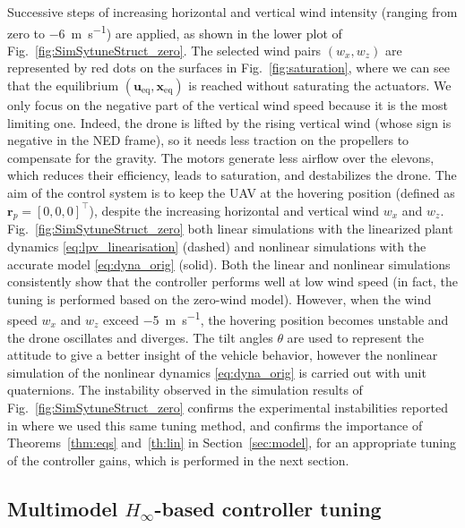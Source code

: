 Successive steps of increasing horizontal and vertical wind intensity (ranging from zero to \SI{-6}{\meter\per\second}) are applied, as shown in the lower plot of Fig.~\ref{fig:SimSytuneStruct_zero}. The selected wind pairs $(w_{x}, w_{z})$ are represented by red dots on the surfaces in Fig.~\ref{fig:saturation}, where we can see that the equilibrium $(\boldsymbol{u}_{\text{eq}}, \boldsymbol{x}_{\text{eq}})$ is reached without saturating the actuators. We only focus on the negative part of the vertical wind speed because it is the most limiting one. Indeed, the drone is lifted by the rising vertical wind (whose sign is negative in the NED frame), so it needs less traction on the propellers to compensate for the gravity. The motors generate less airflow over the elevons, which reduces their efficiency, leads to saturation, and destabilizes the drone.
The aim of the control system is to keep the UAV at the hovering position (defined as $\boldsymbol{r}_{p} = [0,0,0]^\top$), despite the increasing horizontal and vertical wind $w_{x}$ and $w_{z}$. Fig.~\ref{fig:SimSytuneStruct_zero} both linear simulations with the linearized plant dynamics \eqref{eq:lpv_linearisation} (dashed) and nonlinear simulations with the accurate model \eqref{eq:dyna_orig} (solid). Both the linear and nonlinear simulations consistently show that the controller performs well at low wind speed (in fact, the tuning is performed based on the zero-wind model). However, when the wind speed $w_{x}$ and $w_{z}$ exceed \SI{-5}{\meter\per\second}, the hovering position becomes unstable and the drone oscillates and diverges. The tilt angles $\theta$ are used to represent the attitude to give a better insight of the vehicle behavior, however the nonlinear simulation of the nonlinear dynamics \eqref{eq:dyna_orig} is carried out with unit quaternions. The instability observed in the simulation results of Fig.~\ref{fig:SimSytuneStruct_zero} confirms the experimental instabilities reported in \cite{SANSOUACA} where we used this same tuning method, and confirms the importance of Theorems~\ref{thm:eqs} and~\ref{th:lin} in Section~\ref{sec:model}, for an appropriate tuning of the controller gains, which is performed in the next section.

\subsection{\texorpdfstring{Multimodel $H_{\infty}$}{H {infty}}-based controller tuning}
\label{sec:h_inf_multi}

